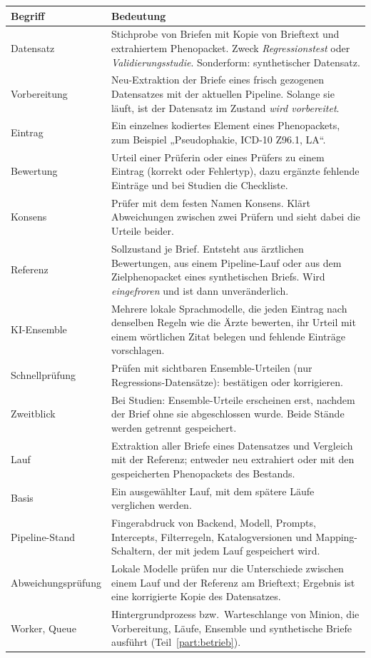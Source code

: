 \documentclass[11pt,a4paper,parskip=half-,headings=standardclasses,toc=bibliography,open=any]{scrreprt}
\begin{document}
\begin{longtable}{@{}P{3.4cm}p{11.2cm}@{}}
\toprule
\textbf{Begriff} & \textbf{Bedeutung}\\
\midrule
\endhead
Datensatz & Stichprobe von Briefen mit Kopie von Brieftext und extrahiertem Phenopacket. Zweck \emph{Regressionstest} oder \emph{Validierungsstudie}. Sonderform: synthetischer Datensatz.\\
Vorbereitung & Neu-Extraktion der Briefe eines frisch gezogenen Datensatzes mit der aktuellen Pipeline. Solange sie läuft, ist der Datensatz im Zustand \emph{wird vorbereitet}.\\
Eintrag & Ein einzelnes kodiertes Element eines Phenopackets, zum Beispiel „Pseudophakie, ICD-10 Z96.1, LA“.\\
Bewertung & Urteil einer Prüferin oder eines Prüfers zu einem Eintrag (korrekt oder Fehlertyp), dazu ergänzte fehlende Einträge und bei Studien die Checkliste.\\
Konsens & Prüfer mit dem festen Namen \textsf{Konsens}. Klärt Abweichungen zwischen zwei Prüfern und sieht dabei die Urteile beider.\\
Referenz & Sollzustand je Brief. Entsteht aus ärztlichen Bewertungen, aus einem Pipeline-Lauf oder aus dem Zielphenopacket eines synthetischen Briefs. Wird \emph{eingefroren} und ist dann unveränderlich.\\
KI-Ensemble & Mehrere lokale Sprachmodelle, die jeden Eintrag nach denselben Regeln wie die Ärzte bewerten, ihr Urteil mit einem wörtlichen Zitat belegen und fehlende Einträge vorschlagen.\\
Schnellprüfung & Prüfen mit sichtbaren Ensemble-Urteilen (nur Regressions-Datensätze): bestätigen oder korrigieren.\\
Zweitblick & Bei Studien: Ensemble-Urteile erscheinen erst, nachdem der Brief ohne sie abgeschlossen wurde. Beide Stände werden getrennt gespeichert.\\
Lauf & Extraktion aller Briefe eines Datensatzes und Vergleich mit der Referenz; entweder neu extrahiert oder mit den gespeicherten Phenopackets des Bestands.\\
Basis & Ein ausgewählter Lauf, mit dem spätere Läufe verglichen werden.\\
Pipeline-Stand & Fingerabdruck von Backend, Modell, Prompts, Intercepts, Filterregeln, Katalogversionen und Mapping-Schaltern, der mit jedem Lauf gespeichert wird.\\
Abweichungsprüfung & Lokale Modelle prüfen nur die Unterschiede zwischen einem Lauf und der Referenz am Brieftext; Ergebnis ist eine korrigierte Kopie des Datensatzes.\\
Worker, Queue & Hintergrundprozess bzw.\ Warteschlange von Minion, die Vorbereitung, Läufe, Ensemble und synthetische Briefe ausführt (Teil~\ref{part:betrieb}).\\
\bottomrule
\end{longtable}
\end{document}
